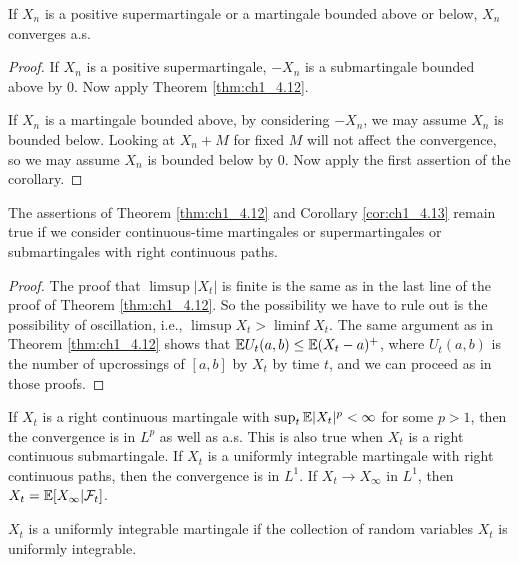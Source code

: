 \begin{corollary}\label{cor:ch1_4.13}
If $X_n$ is a positive supermartingale or a martingale bounded above or below, $X_n$ converges a.s.
\end{corollary}

\begin{proof}
If $X_n$ is a positive supermartingale, $-X_n$ is a submartingale bounded above by $0$. Now apply Theorem \ref{thm:ch1_4.12}.

\mpagebreak

If $X_n$ is a martingale bounded above, by considering $-X_n$, we may assume $X_n$ is bounded below. Looking at $X_n + M$ for fixed $M$ will not affect the convergence, so we may assume $X_n$ is bounded below by $0$. Now apply the first assertion of the corollary.
\end{proof}

\begin{corollary}\label{cor:ch1_4.14}
The assertions of Theorem \ref{thm:ch1_4.12} and Corollary \ref{cor:ch1_4.13} remain true if we consider continuous-time martingales or supermartingales or submartingales with right continuous paths.
\end{corollary}

\begin{proof}
The proof that $\limsup|X_t|$ is finite is the same as in the last line of the proof of Theorem \ref{thm:ch1_4.12}. So the possibility we have to rule out is the possibility of oscillation, i.e., $\limsup X_t > \liminf X_t$. The same argument as in Theorem \ref{thm:ch1_4.12} shows that $\mathbb{E} U_t(a,b) \leq \mathbb{E}(X_t - a)^+$, where $U_t(a,b)$ is the number of upcrossings of $[a,b]$ by $X_t$ by time $t$, and we can proceed as in those proofs.
\end{proof}

\begin{corollary}\label{cor:ch1_4.15}
If $X_t$ is a right continuous martingale with $\sup_t \mathbb{E}|X_t|^p \allowbreak < \infty$ for some $p > 1$, then the convergence is in $L^p$ as well as a.s. This is also true when $X_t$ is a right continuous submartingale. If $X_t$ is a uniformly integrable martingale with right continuous paths, then the convergence is in $L^1$. If $X_t \to X_\infty$ in $L^1$, then $X_t = \mathbb{E}[X_\infty| \mathcal{F}_t]$.
\end{corollary}

$X_t$ is a uniformly integrable martingale if the collection of random variables $X_t$ is uniformly integrable.


